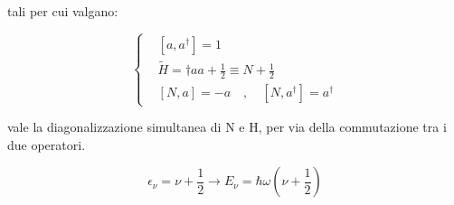 \documentclass{report}
\begin{document}
tali per cui valgano:

\begin{equation}
  \left\{
  \begin{aligned}
     & [a,a^{\dagger}]=1                                    \\
     & \tilde{H}=\dagger aa+\frac{1}{2}\equiv N+\frac{1}{2} \\
     & [N,a]=-a \quad , \quad [N,a^{\dagger}]=a^{\dagger}
  \end{aligned}
  \right.
\end{equation}

vale la diagonalizzazione simultanea di N e H, per via della commutazione tra i due operatori.

\begin{equation}
  \epsilon_\nu=\nu+\frac{1}{2} \rightarrow E_\nu=\hbar \omega(\nu+\frac{1}{2})
\end{equation}
\end{document}
